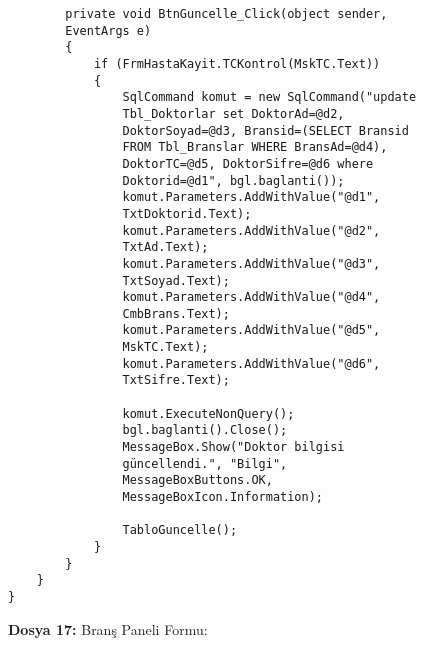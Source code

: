 \begin{lstlisting}
        private void BtnGuncelle_Click(object sender, 
        EventArgs e)
        {
            if (FrmHastaKayit.TCKontrol(MskTC.Text))
            {
                SqlCommand komut = new SqlCommand("update 
                Tbl_Doktorlar set DoktorAd=@d2, 
                DoktorSoyad=@d3, Bransid=(SELECT Bransid 
                FROM Tbl_Branslar WHERE BransAd=@d4), 
                DoktorTC=@d5, DoktorSifre=@d6 where 
                Doktorid=@d1", bgl.baglanti());
                komut.Parameters.AddWithValue("@d1", 
                TxtDoktorid.Text);
                komut.Parameters.AddWithValue("@d2", 
                TxtAd.Text);
                komut.Parameters.AddWithValue("@d3", 
                TxtSoyad.Text);
                komut.Parameters.AddWithValue("@d4", 
                CmbBrans.Text);
                komut.Parameters.AddWithValue("@d5", 
                MskTC.Text);
                komut.Parameters.AddWithValue("@d6", 
                TxtSifre.Text);

                komut.ExecuteNonQuery();
                bgl.baglanti().Close();
                MessageBox.Show("Doktor bilgisi 
                güncellendi.", "Bilgi", 
                MessageBoxButtons.OK, 
                MessageBoxIcon.Information);

                TabloGuncelle();
            }
        }
    }
}
\end{lstlisting}

\textbf{Dosya 17:} Branş Paneli Formu:

